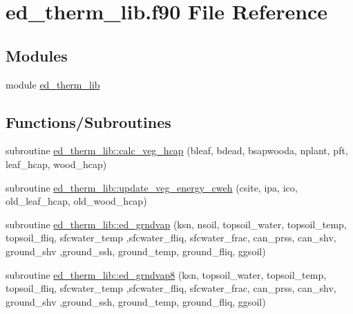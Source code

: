 \hypertarget{ed__therm__lib_8f90}{}\section{ed\+\_\+therm\+\_\+lib.\+f90 File Reference}
\label{ed__therm__lib_8f90}
\subsection*{Modules}
\begin{DoxyCompactItemize}
\item 
module \hyperlink{namespaceed__therm__lib}{ed\+\_\+therm\+\_\+lib}
\end{DoxyCompactItemize}
\subsection*{Functions/\+Subroutines}
\begin{DoxyCompactItemize}
\item 
subroutine \hyperlink{namespaceed__therm__lib_a882f2cd5f4a75f8c01d2167f45afebb7}{ed\+\_\+therm\+\_\+lib\+::calc\+\_\+veg\+\_\+hcap} (bleaf, bdead, bsapwooda, nplant, pft, leaf\+\_\+hcap, wood\+\_\+hcap)
\item 
subroutine \hyperlink{namespaceed__therm__lib_ae2a805729a52bf5814d2c3a0d84f6fe8}{ed\+\_\+therm\+\_\+lib\+::update\+\_\+veg\+\_\+energy\+\_\+cweh} (csite, ipa, ico, old\+\_\+leaf\+\_\+hcap, old\+\_\+wood\+\_\+hcap)
\item 
subroutine \hyperlink{namespaceed__therm__lib_ad7497e216325854214ab9dd57a26f6ee}{ed\+\_\+therm\+\_\+lib\+::ed\+\_\+grndvap} (ksn, nsoil, topsoil\+\_\+water, topsoil\+\_\+temp, topsoil\+\_\+fliq, sfcwater\+\_\+temp                                                                                                   ,sfcwater\+\_\+fliq, sfcwater\+\_\+frac, can\+\_\+prss, can\+\_\+shv, ground\+\_\+shv                                                                                                                                   ,ground\+\_\+ssh, ground\+\_\+temp, ground\+\_\+fliq, ggsoil)
\item 
subroutine \hyperlink{namespaceed__therm__lib_aeb9ec19b3f02291df9155b6204fecf9e}{ed\+\_\+therm\+\_\+lib\+::ed\+\_\+grndvap8} (ksn, topsoil\+\_\+water, topsoil\+\_\+temp, topsoil\+\_\+fliq, sfcwater\+\_\+temp                                                                                                                           ,sfcwater\+\_\+fliq, sfcwater\+\_\+frac, can\+\_\+prss, can\+\_\+shv, ground\+\_\+shv                                                                                                                                   ,ground\+\_\+ssh, ground\+\_\+temp, ground\+\_\+fliq, ggsoil)
\end{DoxyCompactItemize}
